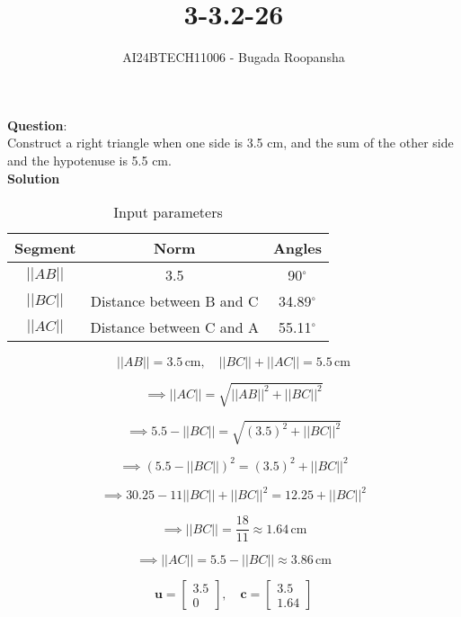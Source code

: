 \documentclass[journal]{IEEEtran}
\begin{document}

\vspace{3cm}

\title{3-3.2-26}
\author{AI24BTECH11006 - Bugada Roopansha}
{\let\newpage\relax\maketitle}  %

\renewcommand{\thefigure}{\theenumi}
\renewcommand{\thetable}{\theenumi}
\setlength{\intextsep}{10pt} %

\textbf{Question}:\\
Construct a right triangle when one side is 3.5 cm, and the sum of the other side and the hypotenuse is 5.5 cm.\\

\textbf{Solution}\\

\begin{table}[h!]
\centering
\begin{tabular}{|c|c|c|}
\hline
	\textbf{Segment} & \textbf{Norm} & \textbf{Angles}\\ \hline
	\( ||AB|| \) & 3.5 & 90$^\circ$\\ \hline
	\( ||BC|| \) & Distance between B and C & 34.89$^\circ$\\ \hline
	\( ||AC|| \) & Distance between C and A & 55.11$^\circ$\\ \hline
\end{tabular}
\caption{Input parameters}
\end{table}

\[ 
||AB|| = 3.5 \, \text{cm}, \quad ||BC|| + ||AC|| = 5.5 \, \text{cm}  
\]

\[
\implies ||AC|| = \sqrt{||AB||^2 + ||BC||^2}  
\]

\[
\implies 5.5 - ||BC|| = \sqrt{(3.5)^2 + ||BC||^2}  
\]

\[
\implies (5.5 - ||BC||)^2 = (3.5)^2 + ||BC||^2  
\]

\[
\implies 30.25 - 11||BC|| + ||BC||^2 = 12.25 + ||BC||^2  
\]

\[
\implies ||BC|| = \frac{18}{11} \approx 1.64 \, \text{cm} 
\]

\[
\implies ||AC|| = 5.5 - ||BC|| \approx 3.86 \, \text{cm} 
\]

\[
\mathbf{u} = \begin{bmatrix} 3.5 \\ 0 \end{bmatrix}, \quad \mathbf{c} = \begin{bmatrix} 3.5 \\ 1.64 \end{bmatrix} 
\]
\end{document}
